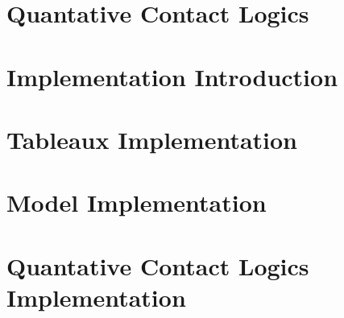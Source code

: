 \documentclass{article}
\begin{document}
	\newpage
	\section{Quantative Contact Logics}

	\newpage
	\section{Implementation Introduction}

	\newpage
	\section{Tableaux Implementation}

	\newpage
	\section{Model Implementation}

	\newpage
	\section{Quantative Contact Logics Implementation}
	
	
\end{document}
